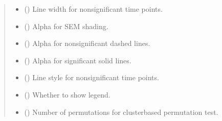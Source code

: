 \documentclass[letterpaper,10pt,english]{sphinxhowto}
\begin{document}
\begin{fulllineitems}
\begin{quote}
\begin{description}
\begin{itemize}
\item {} 
\sphinxAtStartPar
{} (\sphinxstyleliteralemphasis{\sphinxupquote{, }}) \textendash{} Line width for non\sphinxhyphen{}significant time points.

\item {} 
\sphinxAtStartPar
{} (\sphinxstyleliteralemphasis{\sphinxupquote{, }}) \textendash{} Alpha for SEM shading.

\item {} 
\sphinxAtStartPar
{} (\sphinxstyleliteralemphasis{\sphinxupquote{, }}) \textendash{} Alpha for non\sphinxhyphen{}significant dashed lines.

\item {} 
\sphinxAtStartPar
{} (\sphinxstyleliteralemphasis{\sphinxupquote{, }}) \textendash{} Alpha for significant solid lines.

\item {} 
\sphinxAtStartPar
{} (\sphinxstyleliteralemphasis{\sphinxupquote{, }}) \textendash{} Line style for non\sphinxhyphen{}significant time points.

\item {} 
\sphinxAtStartPar
{} (\sphinxstyleliteralemphasis{\sphinxupquote{, }}) \textendash{} Whether to show legend.

\item {} 
\sphinxAtStartPar
{} (\sphinxstyleliteralemphasis{\sphinxupquote{, }}) \textendash{} Number of permutations for cluster\sphinxhyphen{}based permutation test.


\end{itemize}
\end{description}
\end{quote}
\end{fulllineitems}
\end{document}

